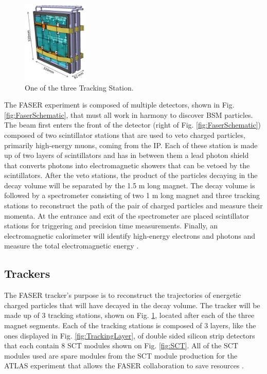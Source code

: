 \begin{figure}
  \centering
    \includegraphics[width=0.28\textwidth]{ChapterFaser/Figs/Raster/TrackerStation.jpg} 
    \caption[Tracking Station]{One of the three Tracking Station.}
    \label{fig:TrackingStation}
\end{figure}

The FASER experiment is composed of multiple detectors, shown in Fig. \ref{fig:FaserSchematic}, that must all work in harmony to discover BSM particles. The beam first enters the front of the detector (right of Fig. \ref{fig:FaserSchematic}) composed of two scintillator stations that are used to veto charged particles, primarily high-energy muons, coming from the IP. Each of these station is made up of two layers of scintillators and has in between them a lead photon shield that converts photons into electromagnetic showers that can be vetoed by the scintillators. After the veto stations, the product of the particles decaying in the decay volume will be separated by the 1.5 m long magnet. The decay volume is followed by a spectrometer consisting of two 1 m long magnet and three tracking stations to reconstruct the path of the pair of charged particles and measure their momenta. At the entrance and exit of the spectrometer are placed scintillator stations for triggering and precision time measurements. Finally, an electromagnetic calorimeter will identify high-energy electrons and photons and measure the total electromagnetic energy \cite{faser_collaboration_technical_2018}.

\subsection{Trackers}
The FASER tracker's purpose is to reconstruct the trajectories of energetic charged particles that will have decayed in the decay volume. The tracker will be made up of 3 tracking stations, shown on Fig. \ref{fig:TrackingStation}, located after each of the three magnet segments. Each of the tracking stations is composed of 3 layers, like the ones displayed in Fig. \ref{fig:TrackingLayer}, of double sided silicon strip detectors that each contain 8 SCT modules shown on Fig. \ref{fig:SCT}. All of the SCT modules used are spare modules from the SCT module production for the ATLAS experiment that allows the FASER collaboration to save 
resources \cite{faser_collaboration_technical_2018}.

